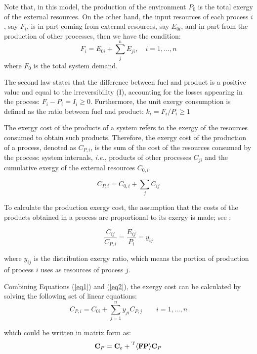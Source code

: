 \documentclass[sustainability,article,accept,moreauthors,pdftex,12pt,a4paper]{mdpi}
\newcommand{\tmbr}[1]{\ensuremath{\prescript{\mathrm{T}}{}{\langle \textbf{#1} \rangle}}}
\newcommand{\vm}[1]{\ensuremath{\mathbf{#1}}}
\begin{document}
Note that, in this model, the production of the environment $P_0$ is the total exergy of the external resources. On the other hand, the input resources of each process $i$, say $F_i$, is in
part coming from external resources, say $E_{0i}$, and in part from the
production of other processes, then we have the condition:
\begin{equation}
\label{eq:P}
F_i=E_{0i}+\sum_{j}^{n}E_{ji}, \quad i=1,\ldots,n
\end{equation}
\noindent where $F_0$ is the total system demand.


The second law states that the difference between fuel and product is a positive 
value and equal to the irreversibility (I), accounting for the losses 
appearing in the process: $F_i - P_i = I_i \geq 0$. Furthermore, the unit 
exergy consumption is defined as the ratio between fuel and product: 
$k_i={F_i}/{P_i} \geq 1$

The exergy cost of the products of a system refers to the exergy of the resources consumed to obtain such products. Therefore, the exergy cost of the production of a process, denoted as $C_{P,i}$, is the sum of the cost of the resources consumed by the process: system internals, \textit{i.e.}, products of other processes $C_{ji}$ and the cumulative exergy of the external resources $C_{0,i}$.

\begin{equation}
 C_{P,i}=C_{0,i}+\sum_{j}C_{ij}
 \label{eq1}
\end{equation}

To calculate the production exergy cost, the assumption that the costs of the products obtained in a process are proportional to its exergy is made; see \cite{Lozano1993}:

\begin{equation}
\frac{C_{ij}}{C_{P,i}}=\frac{E_{ij}}{P_i}=y_{ij}
\label{eq2}
\end{equation}

\noindent where $y_{ij}$ is the distribution exergy ratio, which means the portion of production of process $i$ uses as resources of process $j$.

Combining Equations (\ref{eq1}) and (\ref{eq2}), the exergy cost can be calculated by solving the following set of linear equations:
\begin{equation}
C_{P,i}=C_{0i}+\sum_{j=1}^{n}{y_{ji}C_{P,j}} \qquad i=1,\ldots, n
\end{equation}

\noindent which could be written in matrix form as:
\begin{equation}
\vm{C}_P = \vm{C}_e + \tmbr{FP} \vm{C}_P
\end{equation}
\end{document}
